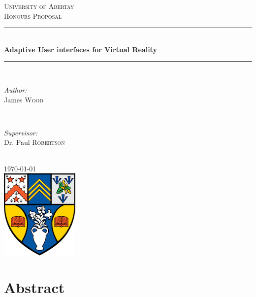 \documentclass[11pt]{article}
\begin{document}
\begin{titlepage}

\newcommand{\HRule}{\rule{\linewidth}{0.5mm}}

\center

\textsc{\LARGE University of Abertay}\\[1.5cm]
\textsc{\Large Honours Proposal}\\[0.5cm]

\HRule \\[0.4cm]
{ \huge \bfseries Adaptive User interfaces for Virtual Reality}\\[0.4cm]
\HRule \\[1.5cm]
 
\begin{minipage}{0.4\textwidth}
\begin{flushleft} \large
\emph{Author:}\\
James \textsc{Wood}
\end{flushleft}
\end{minipage}
~
\begin{minipage}{0.4\textwidth}
\begin{flushright} \large
\emph{Supervisor:} \\
Dr. Paul \textsc{Robertson}
\end{flushright}
\end{minipage}\\[2cm]

{\large \today}\\[2cm]

\includegraphics{logo.png}\\[1cm]

\vfill

\end{titlepage}

\tableofcontents

\pagebreak

\section{Abstract}
\end{document}
